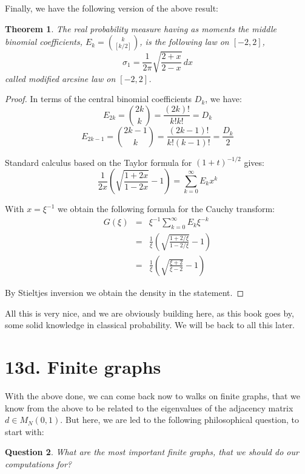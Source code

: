 \documentclass[12pt]{amsbook}
\newtheorem{theorem}{Theorem}[chapter]
\newtheorem{question}[theorem]{Question}
\begin{document}
Finally, we have the following version of the above result:


\begin{theorem}
The real probability measure having as moments the middle binomial coefficients, $E_k=\binom{k}{[k/2]}$, is the following law on $[-2,2]$,
$$\sigma_1=\frac{1}{2\pi}\sqrt{\frac{2+x}{2-x}}\,dx$$
called modified arcsine law on $[-2,2]$.
\end{theorem}

\begin{proof}
In terms of the central binomial coefficients $D_k$, we have:
$$E_{2k}=\binom{2k}{k}=\frac{(2k)!}{k!k!}=D_k$$
$$E_{2k-1}=\binom{2k-1}{k}=\frac{(2k-1)!}{k!(k-1)!}=\frac{D_k}{2}$$

Standard calculus based on the Taylor formula for $(1+t)^{-1/2}$ gives:
$$\frac{1}{2x}\left(\sqrt{\frac{1+2x}{1-2x}}-1\right)=\sum_{k=0}^\infty E_kx^k$$

With $x=\xi^{-1}$ we obtain the following formula for the Cauchy transform:
\begin{eqnarray*}
G(\xi)
&=&\xi^{-1}\sum_{k=0}^\infty E_k\xi^{-k}\\
&=&\frac{1}{\xi}\left(\sqrt{\frac{1+2/\xi}{1-2/\xi}}-1\right)\\
&=&\frac{1}{\xi}\left(\sqrt{\frac{\xi+2}{\xi-2}}-1\right)
\end{eqnarray*}

By Stieltjes inversion we obtain the density in the statement.
\end{proof}

All this is very nice, and we are obviously building here, as this book goes by, some solid knowledge in classical probability. We will be back to all this later.

\section*{13d. Finite graphs}

With the above done, we can come back now to walks on finite graphs, that we know from the above to be related to the eigenvalues of the adjacency matrix $d\in M_N(0,1)$. But here, we are led to the following philosophical question, to start with:

\begin{question}
What are the most important finite graphs, that we should do our computations for?
\end{question}
\end{document}
